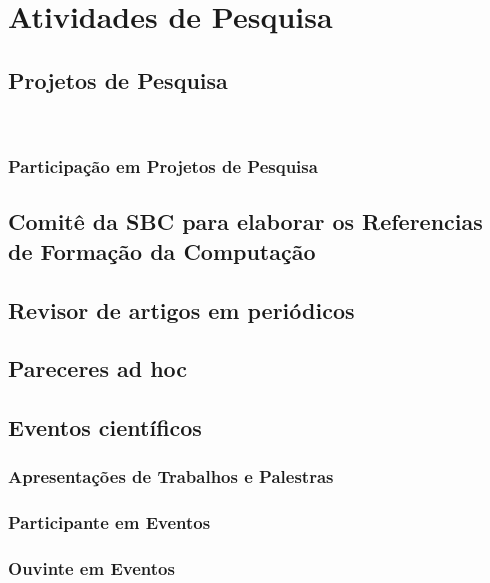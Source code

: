 
\chapter{Atividades de Pesquisa}\label{cap:pesquisa}

\lipsum[81]

\section{Projetos de Pesquisa}\label{sec:projetos}
\
\subsection{Participação em Projetos de Pesquisa}

\section{Comitê da SBC para elaborar os Referencias de Formação da Computação}

\section{Revisor de artigos em periódicos}

\section{Pareceres ad hoc}

\section{Eventos científicos}

\subsection{Apresentações de Trabalhos e Palestras}



\subsection{Participante em Eventos}



\subsection{Ouvinte em Eventos}

